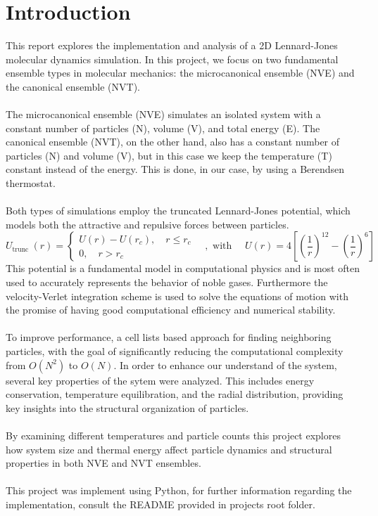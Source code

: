 \section*{Introduction}\label{sec:introduction} %
This report explores the implementation and analysis of a 2D Lennard-Jones molecular dynamics simulation. In this project, we focus on two fundamental ensemble types in molecular mechanics: the microcanonical ensemble (NVE) and the canonical ensemble (NVT). \\
\\
The microcanonical ensemble (NVE) simulates an isolated system with a constant number of particles (N), volume (V), and total energy (E). The canonical ensemble (NVT), on the other hand, also has a constant number of particles (N) and volume (V), but in this case we keep the temperature (T) constant instead of the energy. This is done, in our case, by using a Berendsen thermostat.\\
\\
Both types of simulations employ the truncated Lennard-Jones potential, which models both the attractive and repulsive forces between particles.
\begin{equation}
	U_{\text {trunc }}(r)=\left\{\begin{array}{l}
		U(r)-U\left(r_c\right), \quad r \leq r_c \\
		0, \quad r>r_c
	\end{array} \quad, \text { with } \quad U(r)=4\left[\left(\frac{1}{r}\right)^{12}-\left(\frac{1}{r}\right)^6\right]\right.
\end{equation}
This potential is a fundamental model in computational physics and is most often used to accurately represents the behavior of noble gases. Furthermore the velocity-Verlet integration scheme is used to solve the equations of motion with the promise of having good computational efficiency and numerical stability.\\
\\
To improve performance, a cell lists based approach for finding neighboring particles, with the goal of significantly reducing the computational complexity from $O(N^2)$ to $O(N)$. In order to enhance our understand of the system, several key properties of the sytem were analyzed. This includes energy conservation, temperature equilibration, and the radial distribution, providing key insights into the structural organization of particles. \\
\\
By examining different temperatures and particle counts this project explores how system size and thermal energy affect particle dynamics and structural properties in both NVE and NVT ensembles.\\
\\
This project was implement using Python, for further information regarding the implementation, consult the README provided in projects root folder.

